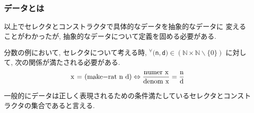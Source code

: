 \subsubsection{データとは}
以上でセレクタとコンストラクタで具体的なデータを抽象的なデータに
変えることがわかったが, 抽象的なデータについて定義を固める必要がある.

\noindent
分数の例において, セレクタについて考える時,
${}^{\forall} ($\lstinline{n}$, $\lstinline{d}$)
\in (\mathbb{N}\times \mathbb{N}\backslash \{0\})$
に対して, 次の関係が満たされる必要がある.
\[
  \text{\lstinline{x = (make-rat n d)}} \Leftrightarrow
  \frac{\text{\lstinline{numer x}}}{\text{\lstinline{denom x}}}
  = \frac{\text{\lstinline{n}}}{\text{\lstinline{d}}}
\]

一般的にデータは正しく表現されるための条件満たしているセレクタとコンストラクタの集合であると言える.
